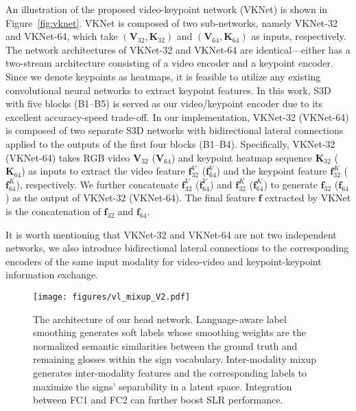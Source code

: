 \documentclass[10pt,twocolumn,letterpaper]{article}
\begin{document}
An illustration of the proposed video-keypoint network (VKNet) is shown in Figure~\ref{fig:vknet}. VKNet is composed of two sub-networks, namely VKNet-32 and VKNet-64, which take $(\boldsymbol{V}_{32}, \boldsymbol{K}_{32})$ and $(\boldsymbol{V}_{64}, \boldsymbol{K}_{64})$ as inputs, respectively. The network architectures of VKNet-32 and VKNet-64 are identical—either has a two-stream architecture consisting of a video encoder and a keypoint encoder. Since we denote keypoints as heatmaps, it is feasible to utilize any existing convolutional neural networks to extract keypoint features. In this work, S3D \cite{xie2018rethinking} with five blocks (B1--B5) is served as our video/keypoint encoder due to its excellent accuracy-speed trade-off. In our implementation, VKNet-32 (VKNet-64) is composed of two separate S3D networks with bidirectional lateral connections \cite{duan2022revisiting} applied to the outputs of the first four blocks (B1--B4). Specifically, VKNet-32 (VKNet-64) takes RGB video $\boldsymbol{V}_{32}$ ($\boldsymbol{V}_{64}$) and keypoint heatmap sequence $\boldsymbol{K}_{32}$ ($\boldsymbol{K}_{64}$) as inputs to extract the video feature $\boldsymbol{f}_{32}^{V}$ ($\boldsymbol{f}_{64}^{V}$) and the keypoint feature $\boldsymbol{f}_{32}^{K}$ ($\boldsymbol{f}_{64}^{K}$), respectively. 
We further concatenate $\boldsymbol{f}_{32}^{V}$ ($\boldsymbol{f}_{64}^{V}$) and $\boldsymbol{f}_{32}^{K}$ ($\boldsymbol{f}_{64}^{K}$) to generate $\boldsymbol{f}_{32}$ ($\boldsymbol{f}_{64}$) as the output of VKNet-32 (VKNet-64). The final feature $\boldsymbol{f}$ extracted by VKNet is the concatenation of $\boldsymbol{f}_{32}$ and $\boldsymbol{f}_{64}$.



It is worth mentioning that VKNet-32 and VKNet-64 are not two independent networks, we also introduce bidirectional lateral connections \cite{duan2022revisiting} to the corresponding encoders of the same input modality for video-video and keypoint-keypoint information exchange.



\begin{figure}[t]
\centering
\texttt{[image: figures/vl\_mixup\_V2.pdf]}
\vspace{-7mm}
\caption{
The architecture of our head network. Language-aware label smoothing generates soft labels whose smoothing weights are the normalized semantic similarities between the ground truth and remaining glosses within the sign vocabulary. Inter-modality mixup generates inter-modality features and the corresponding labels to maximize the signs' separability in a latent space.
Integration between FC1 and FC2 can further boost SLR performance.
}
\vspace{-5mm}
\label{fig:vl_mixup}
\end{figure}
\end{document}
